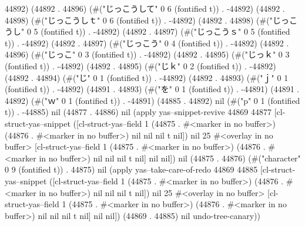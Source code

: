 44892) (44892 . 44896) (#("じっこうして" 0 6 (fontified t)) . -44892) (44892 . 44898) (#("じっこうしｔ" 0 6 (fontified t)) . -44892) (44892 . 44898) (#("じっこうし" 0 5 (fontified t)) . -44892) (44892 . 44897) (#("じっこうｓ" 0 5 (fontified t)) . -44892) (44892 . 44897) (#("じっこう" 0 4 (fontified t)) . -44892) (44892 . 44896) (#("じっこ" 0 3 (fontified t)) . -44892) (44892 . 44895) (#("じっｋ" 0 3 (fontified t)) . -44892) (44892 . 44895) (#("じｋ" 0 2 (fontified t)) . -44892) (44892 . 44894) (#("じ" 0 1 (fontified t)) . -44892) (44892 . 44893) (#("ｊ" 0 1 (fontified t)) . -44892) (44891 . 44893) (#("を" 0 1 (fontified t)) . -44891) (44891 . 44892) (#("ｗ" 0 1 (fontified t)) . -44891) (44885 . 44892) nil (#("p" 0 1 (fontified t)) . -44885) nil (44877 . 44886) nil (apply yas--snippet-revive 44869 44877 [cl-struct-yas--snippet ([cl-struct-yas--field 1 (44875 . #<marker in no buffer>) (44876 . #<marker in no buffer>) nil nil nil t nil]) nil 25 #<overlay in no buffer> [cl-struct-yas--field 1 (44875 . #<marker in no buffer>) (44876 . #<marker in no buffer>) nil nil nil t nil] nil nil]) nil (44875 . 44876) (#("character" 0 9 (fontified t)) . 44875) nil (apply yas--take-care-of-redo 44869 44885 [cl-struct-yas--snippet ([cl-struct-yas--field 1 (44875 . #<marker in no buffer>) (44876 . #<marker in no buffer>) nil nil nil t nil]) nil 25 #<overlay in no buffer> [cl-struct-yas--field 1 (44875 . #<marker in no buffer>) (44876 . #<marker in no buffer>) nil nil nil t nil] nil nil]) (44869 . 44885) nil undo-tree-canary))
